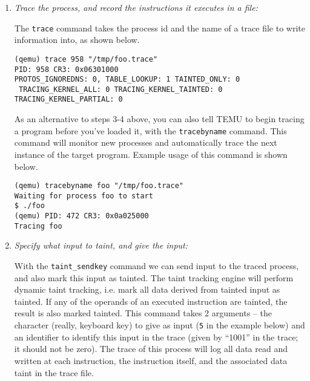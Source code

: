 \begin {enumerate}
The PID, here 958, is shown on the header line for the named process.
The other information isn't relevant for what we're doing, but if
you're curious, the \verb'CR3' value is a pointer to the kernel-space
page table for each process, and the remaining lines show the virtual
address ranges for the process's various segments (mappings), which
are either text or data segments from executables or shared libraries,
or anonymous heap or stack areas.

For a Windows image, you need to run the \texttt{guest\_ps} command
instead of \texttt{linux\_ps}.

\item \emph {Trace the process, and record the instructions it executes in a file:}

The  \texttt{trace} command takes  the process  id and  the name  of a
trace file to write information into, as shown below.

\begin{Verbatim}[frame=lines, framesep=.5em]
(qemu) trace 958 "/tmp/foo.trace"
PID: 958 CR3: 0x06301000
PROTOS_IGNOREDNS: 0, TABLE_LOOKUP: 1 TAINTED_ONLY: 0
 TRACING_KERNEL_ALL: 0 TRACING_KERNEL_TAINTED: 0 TRACING_KERNEL_PARTIAL: 0
\end{Verbatim}

As an alternative to steps 3-4 above, you can also tell TEMU to begin 
tracing a program before you've loaded it, with the \texttt{tracebyname} 
command. This command will monitor new processes and automatically trace 
the next instance of the target program. Example usage of this command is 
shown below.

\begin{Verbatim}[frame=lines, framesep=.5em]
(qemu) tracebyname foo "/tmp/foo.trace"
Waiting for process foo to start
$ ./foo
(qemu) PID: 472 CR3: 0x0a025000
Tracing foo
\end{Verbatim}

\item \emph {Specify what input to taint, and give the input:}

With the \texttt {taint\_sendkey} command we can send input to the
traced process, and also mark this input as tainted.  The taint
tracking engine will perform dynamic taint tracking, i.e. mark all
data derived from tainted input as tainted.  If any of the operands of
an executed instruction are tainted, the result is also marked
tainted.  This command takes 2 arguments -- the character (really,
keyboard key) to give as input (\texttt{5} in the example below) and
an identifier to identify this input in the trace (given by ``1001''
in the trace; it should not be zero).
The trace of this process will log all data read and
written at each instruction, the instruction itself, and the
associated data taint in the trace file.


\end{enumerate}
